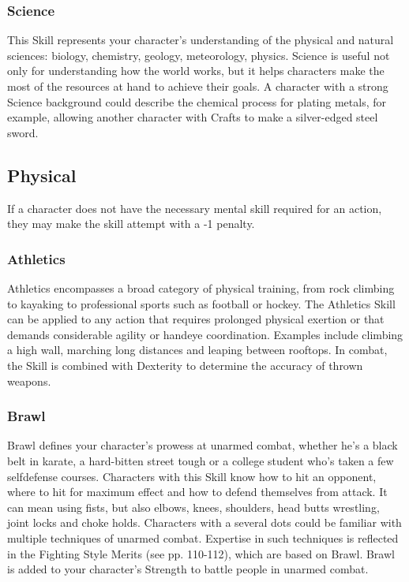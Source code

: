 \documentclass["../Misguided by Starlight.tex"]{subfiles}
\begin{document}
\subsubsection{Science}
This Skill represents your character’s understanding of the physical and natural sciences: biology, chemistry, geology, meteorology, physics. Science is useful not only for understanding how the world works, but it helps characters make the most of the resources at hand to achieve their goals. A character with a strong Science background could describe the chemical process for plating metals, for example, allowing another character with Crafts to make a silver-edged steel sword.


\subsection{Physical}
If a character does not have the necessary mental skill required for an action, they may make the skill attempt with a -1 penalty.

\subsubsection{Athletics}
Athletics encompasses a broad category of physical training, from rock climbing to kayaking to professional sports such as football or hockey. The Athletics Skill can be applied to any action that requires prolonged physical exertion or that demands considerable agility or handeye coordination. Examples include climbing a high wall, marching long distances and leaping between rooftops. In combat, the Skill is combined with Dexterity to determine the accuracy of thrown weapons.

\subsubsection{Brawl}
Brawl defines your character’s prowess at unarmed combat, whether he’s a black belt in karate, a hard-bitten street tough or a college student who’s taken a few selfdefense courses. Characters with this Skill know how to hit an opponent, where to hit for maximum effect and how to defend themselves from attack. It can mean using fists, but also elbows, knees, shoulders, head butts wrestling, joint locks and choke holds. Characters with a several dots could be familiar with multiple techniques of unarmed combat. Expertise in such techniques is reflected in the Fighting Style Merits (see pp. 110-112), which are based on Brawl. Brawl is added to your character’s Strength to battle people in unarmed combat.
\end{document}
